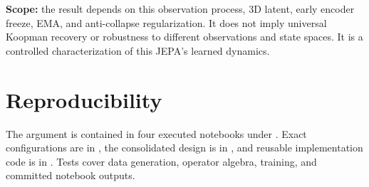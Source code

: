 \documentclass[11pt,a4paper]{article}
\begin{document}
\textbf{Scope:} the result depends on this observation process, 3D latent,
early encoder freeze, EMA, and anti-collapse regularization. It does not imply
universal Koopman recovery or robustness to different observations and state
spaces. It is a controlled characterization of this JEPA's learned dynamics.

\section*{Reproducibility}

The argument is contained in four executed notebooks under
. Exact configurations are in , the consolidated
design is in , and reusable implementation code is in
. Tests cover data generation, operator algebra,
training, and committed notebook outputs.
\end{document}

